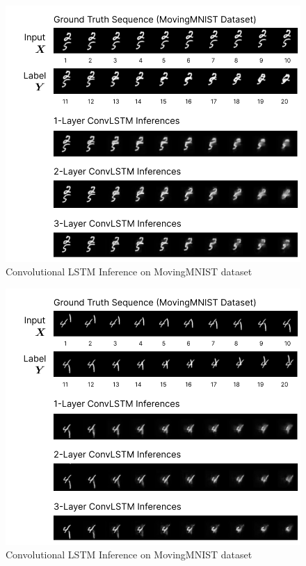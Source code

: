 \documentclass{scrartcl}
\begin{document}
\begin{figure}[H]
	\begin{center}
		\includegraphics[width=1\textwidth]{inferences/mmnist/mmnist_inferences_1.png}
	\end{center}
	\caption{Convolutional LSTM Inference on MovingMNIST dataset}
	\label{inf:lstm_mmnist_inference_1}
\end{figure}

\begin{figure}[H]
	\begin{center}
		\includegraphics[width=1\textwidth]{inferences/mmnist/mmnist_inferences_2.png}
	\end{center}
	\caption{Convolutional LSTM Inference on MovingMNIST dataset}
	\label{inf:lstm_mmnist_inference_2}
\end{figure}
\end{document}
